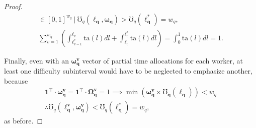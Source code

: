 \documentclass[hidelinks, nonatbib]{elsarticle}
\begin{document}
\begin{lemma}
\begin{proof}
\begin{gather}
            \in
            [0,1]^{w_q}
            \
            \big|
            \
            \mho_{q}(
                \boldsymbol{\ell_q}
                ,\boldsymbol{\omega_q}
            ) 
            >
            \mho_{q}(
                \boldsymbol{\ell_{q}^{*}}
            )
            =
            w_q
            ,
            \\
            \sum_{v=1}^{w_q}
            \left(
                \int_{
                    \ell_{v-1}^{*}
                }^{
                    \ell_{v}
                }
                \text{ta}(l)dl
                +
                \int_{
                    \ell_{v}
                }^{
                    \ell_{v}^{*}
                }
                \text{ta}(l)dl
            \right)
            =
            \int_{0}^{1}
            \text{ta}(l)dl
            =
            1
            .
        \end{gather}
        
        Finally, even with an $\boldsymbol{\omega_{q}^{v}}$ vector of partial time allocations for each worker, at least one difficulty subinterval would have to be neglected to emphasize another, because
        \begin{gather}
            \boldsymbol{1} ^ \top
            \cdot
            \boldsymbol{\omega_{q}^{v}}
            =
            \boldsymbol{1} ^ \top
            \cdot
            \boldsymbol{\Omega_{q}^{v}}
            =
            1
            \implies
            \min\left(
                \boldsymbol{\omega_{q}^{v}}
                \times
                \boldsymbol{\mho_q}(
                    \boldsymbol{\ell_{q}}
                )
            \right)
            <
            w_q
            \\
            \therefore
            \mho_q(
                \boldsymbol{\ell_{q}^{v}},
                \boldsymbol{\omega_{q}^{v}}
            )
            <
            \mho_q(
                \boldsymbol{\ell_{q}^{*}}
            )
            =
            w_q
            ,
        \end{gather}
        as before.
        

\end{proof}
\end{lemma}
\end{document}
